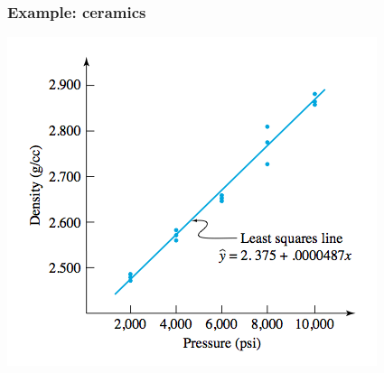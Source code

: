 \documentclass[handout]{beamer}\usepackage{graphicx, color}
\numberwithin{equation}{section}
\begin{document}
\begin{frame}
\frametitle{Example: ceramics}
 \includegraphics{../../fig/ceramicsplot.png}
\end{frame}
\end{document}
